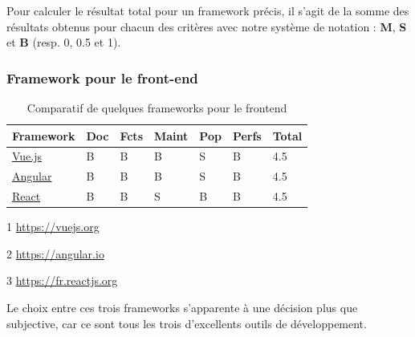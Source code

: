 Pour calculer le résultat total pour un framework précis, il s'agit de la somme des résultats obtenus pour chacun des critères avec notre système de notation : \textbf{M}, \textbf{S} et \textbf{B} (resp. 0, 0.5 et 1).

\subsubsection*{Framework pour le front-end}
\begin{table}[H]
    \centering
    \begin{threeparttable}
    \begin{tabular}{| l | l | l | l | l | l | l |}
    \hline
        Framework & Doc & Fcts & Maint & Pop & Perfs & Total \\
    \hline
        \href{https://vuejs.org}{Vue.js}\tnote{1} &
        B &  
        B &
        B &            
        S &              
        B &
        4.5 \\
    \hline
        \href{https://angular.io}{Angular}\tnote{2} &
        B &                
        B &   
        B &
        S &              
        B &       
        4.5 \\
    \hline
        \href{https://fr.reactjs.org}{React}\tnote{3} &
        B &                
        B &     
        S &
        B &              
        B &       
        4.5 \\  
    \hline
    \end{tabular}
    \begin{tablenotes}
        \item[1] \url{https://vuejs.org}
        \item[2] \url{https://angular.io}
        \item[3] \url{https://fr.reactjs.org}
    \end{tablenotes}
    \end{threeparttable}
    \caption{Comparatif de quelques frameworks pour le \Gls{frontend}}
    \label{table:compFrameworksFrontend}
\end{table}

Le choix entre ces trois frameworks s'apparente à une décision plus que subjective, car ce sont tous les trois d'excellents outils de développement. \\

